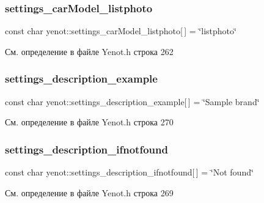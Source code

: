 \subsubsection{\texorpdfstring{settings\+\_\+car\+Model\+\_\+listphoto}{settings\_carModel\_listphoto}}
{\footnotesize\ttfamily const char yenot\+::settings\+\_\+car\+Model\+\_\+listphoto\mbox{[}$\,$\mbox{]} = \char`\"{}listphoto\char`\"{}}



См. определение в файле Yenot.\+h строка 262

\mbox{\label{namespaceyenot_a37f90b0081fe0617055470d46489ea0f}} 
\subsubsection{\texorpdfstring{settings\+\_\+description\+\_\+example}{settings\_description\_example}}
{\footnotesize\ttfamily const char yenot\+::settings\+\_\+description\+\_\+example\mbox{[}$\,$\mbox{]} = \char`\"{}Sample brand\char`\"{}}



См. определение в файле Yenot.\+h строка 270

\mbox{\label{namespaceyenot_a53b4bd62fd7a6e3abedfdfb47db53284}} 
\subsubsection{\texorpdfstring{settings\+\_\+description\+\_\+ifnotfound}{settings\_description\_ifnotfound}}
{\footnotesize\ttfamily const char yenot\+::settings\+\_\+description\+\_\+ifnotfound\mbox{[}$\,$\mbox{]} = \char`\"{}Not found\char`\"{}}



См. определение в файле Yenot.\+h строка 269

\mbox{\label{namespaceyenot_a6a7294929420d7790b72f733c98bcf56}} 
